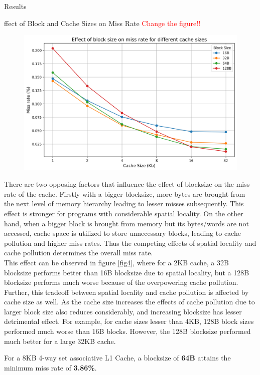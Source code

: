 \begin{section}{Results}
\begin{subsection}{ffect of Block and Cache Sizes on Miss Rate \textcolor{red}{Change the figure!!}}
    \begin{figure}[h]
        \includegraphics[width=\textwidth]{figures/fig4/fig4.png}
        \centering
        \label{fig:fig4}
    \end{figure}

    There are two opposing factors that influence the effect of blocksize on the miss rate of the cache. Firstly with a bigger blocksize, more bytes are brought from the next level of memory hierarchy leading to lesser misses subsequently. This effect is stronger for programs with considerable spatial locality. On the other hand, when a bigger block is brought from memory but its bytes/words are not accessed, cache space is utilized to store unnecessary blocks, leading to cache pollution and higher miss rates. Thus the competing effects of spatial locality and cache pollution determines the overall miss rate.\\
    This effect can be observed in figure \ref{fig4}, where for a 2KB cache, a 32B blocksize performs better than 16B blocksize due to spatial locality, but a 128B blocksize performs much worse because of the overpowering cache pollution.\\
    Further, this tradeoff between spatial locality and cache pollution is affected by cache size as well. As the cache size increases the effects of cache pollution due to larger block size also reduces considerably, and increasing blocksize has lesser detrimental effect. For example, for cache sizes lesser than 4KB, 128B block sizes performed much worse than 16B blocks. However, the 128B blocksize performed much better for a large 32KB cache.   

    For a 8KB 4-way set associative L1 Cache, a blocksize of \textbf{64B} attains the minimum miss rate of \textbf{3.86\%}.
    

\end{subsection}
\end{section}
